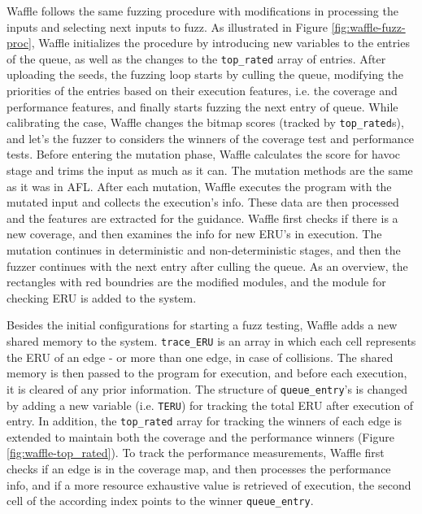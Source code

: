 Waffle follows the same fuzzing procedure with modifications in processing the inputs and selecting next inputs to fuzz. As illustrated in Figure \ref{fig:waffle-fuzz-proc}, Waffle initializes the procedure by introducing new variables to the entries of the queue, as well as the changes to the \texttt{top\_rated} array of entries. After uploading the seeds, the fuzzing loop starts by culling the queue, modifying the priorities of the entries based on their execution features, i.e. the coverage and performance features, and finally starts fuzzing the next entry of queue. While calibrating the case, Waffle changes the bitmap scores (tracked by \texttt{top\_rated}s), and let's the fuzzer to considers the winners of the coverage test and performance tests. Before entering the mutation phase, Waffle calculates the score for havoc stage and trims the input as much as it can. The mutation methods are the same as it was in AFL. After each mutation, Waffle executes the program with the mutated input and collects the execution's info. These data are then processed and the features are extracted for the guidance. Waffle first checks if there is a new coverage, and then examines the info for new ERU's in execution. The mutation continues in deterministic and non-deterministic stages, and then the fuzzer continues with the next entry after culling the queue. As an overview, the rectangles with red boundries are the modified modules, and the module for checking ERU is added to the system.


Besides the initial configurations for starting a fuzz testing, Waffle adds a new shared memory to the system. \texttt{trace\_ERU} is an array in which each cell represents the ERU of an edge - or more than one edge, in case of collisions. The shared memory is then passed to the program for execution, and before each execution, it is cleared of any prior information. The structure of \texttt{queue\_entry}'s is changed by adding a new variable (i.e. \texttt{TERU}) for tracking the total ERU after execution of entry. In addition, the \texttt{top\_rated} array for tracking the winners of each edge is extended to maintain both the coverage and the performance winners (Figure \ref{fig:waffle-top_rated}). To track the performance measurements, Waffle first checks if an edge is in the coverage map, and then processes the performance info, and if a more resource exhaustive value is retrieved of execution, the second cell of the according index points to the winner \texttt{queue\_entry}. 

